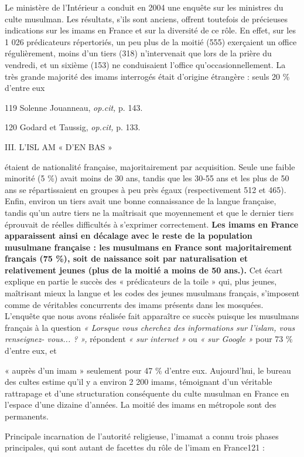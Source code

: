 Le ministère de l'Intérieur a conduit en 2004 une enquête sur les
ministres du culte musulman. Les résultats, s'ils sont anciens, offrent
toutefois de précieuses indications sur les imams en France et sur la
diversité de ce rôle. En effet, sur les 1 026 prédicateurs répertoriés,
un peu plus de la moitié (555) exerçaient un office régulièrement, moins
d'un tiers (318) n'intervenait que lors de la prière du vendredi, et un
sixième (153) ne conduisaient l'office qu'occasionnellement. La très
grande majorité des imams interrogés était d'origine étrangère : seuls
20 \% d'entre eux

119 Solenne Jouanneau, \emph{op.cit,} p. 143.

120 Godard et Taussig, \emph{op.cit,} p. 133.

III. L'ISL AM « D'EN BAS »

étaient de nationalité française, majoritairement par acquisition. Seule
une faible minorité (5 \%) avait moins de 30 ans, tandis que les 30-55
ans et les plus de 50 ans se répartissaient en groupes à peu près égaux
(respectivement 512 et 465). Enfin, environ un tiers avait une bonne
connaissance de la langue française, tandis qu'un autre tiers ne la
maîtrisait que moyennement et que le dernier tiers éprouvait de réelles
difficultés à s'exprimer correctement. \textbf{Les imams en France
apparaissent ainsi en décalage avec le reste de la population musulmane
française : les musulmans en France sont majoritairement français (75
\%), soit de naissance soit par naturalisation et relativement jeunes
(plus de la moitié a moins de 50 ans.).} Cet écart explique en partie le
succès des « prédicateurs de la toile » qui, plus jeunes, maîtrisant
mieux la langue et les codes des jeunes musulmans français, s'imposent
comme de véritables concurrents des imams présents dans les mosquées.
L'enquête que nous avons réalisée fait apparaître ce succès puisque les
musulmans français à la question \emph{« Lorsque vous cherchez des
informations sur l'islam, vous renseignez- vous... ? »,} répondent
\emph{« sur internet »} ou \emph{« sur Google »} pour 73 \% d'entre eux,
et

« auprès d'un imam » seulement pour 47 \% d'entre eux. Aujourd'hui, le
bureau des cultes estime qu'il y a environ 2 200 imams, témoignant d'un
véritable rattrapage et d'une structuration conséquente du culte
musulman en France en l'espace d'une dizaine d'années. La moitié des
imams en métropole sont des permanents.

Principale incarnation de l'autorité religieuse, l'imamat a connu trois
phases principales, qui sont autant de facettes du rôle de l'imam en
France121 :


